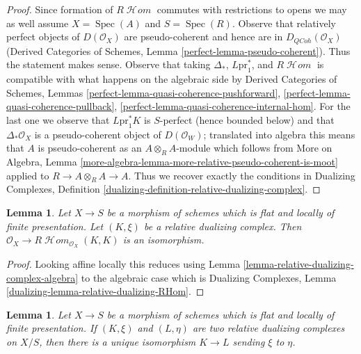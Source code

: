 \documentclass{stacks-project}
\theoremstyle{plain}
\newtheorem{lemma}[subsection]{Lemma}
\theoremstyle{definition}
\theoremstyle{remark}
\numberwithin{equation}{subsection}
\def\Spec{\mathop{\mathrm{Spec}}}
\def\SheafHom{\mathop{\mathcal{H}\!\mathit{om}}\nolimits}
\def\QCoh{\mathit{QCoh}}
\begin{document}
\begin{proof}
Since formation of $R\SheafHom$ commutes with restrictions to
opens we may as well assume $X = \Spec(A)$ and $S = \Spec(R)$.
Observe that relatively perfect objects of $D(\mathcal{O}_X)$
are pseudo-coherent and hence are in $D_\QCoh(\mathcal{O}_X)$
(Derived Categories of Schemes, Lemma \ref{perfect-lemma-pseudo-coherent}).
Thus the statement makes sense.
Observe that taking $\Delta_*$, $L\text{pr}_1^*$, and
$R\SheafHom$ is compatible with what happens on the algebraic
side by
Derived Categories of Schemes,
Lemmas \ref{perfect-lemma-quasi-coherence-pushforward},
\ref{perfect-lemma-quasi-coherence-pullback},
\ref{perfect-lemma-quasi-coherence-internal-hom}.
For the last one we observe that $L\text{pr}_1^*K$
is $S$-perfect (hence bounded below) and that $\Delta_*\mathcal{O}_X$
is a pseudo-coherent object of $D(\mathcal{O}_W)$;
translated into algebra this means that $A$ is pseudo-coherent
as an $A \otimes_R A$-module which follows from
More on Algebra, Lemma
\ref{more-algebra-lemma-more-relative-pseudo-coherent-is-moot}
applied to $R \to A \otimes_R A \to A$.
Thus we recover exactly the conditions in
Dualizing Complexes, Definition
\ref{dualizing-definition-relative-dualizing-complex}.
\end{proof}

\begin{lemma}
\label{lemma-relative-dualizing-RHom}
Let $X \to S$ be a morphism of schemes which is flat and
locally of finite presentation. Let $(K, \xi)$ be a relative
dualizing complex. Then
$\mathcal{O}_X \to R\SheafHom_{\mathcal{O}_X}(K, K)$
is an isomorphism.
\end{lemma}

\begin{proof}
Looking affine locally this reduces using
Lemma \ref{lemma-relative-dualizing-complex-algebra}
to the algebraic case which is
Dualizing Complexes, Lemma \ref{dualizing-lemma-relative-dualizing-RHom}.
\end{proof}

\begin{lemma}
\label{lemma-uniqueness-relative-dualizing}
Let $X \to S$ be a morphism of schemes which is flat and
locally of finite presentation. If $(K, \xi)$ and $(L, \eta)$
are two relative dualizing complexes on $X/S$, then there is a unique
isomorphism $K \to L$ sending $\xi$ to $\eta$.
\end{lemma}
\end{document}
